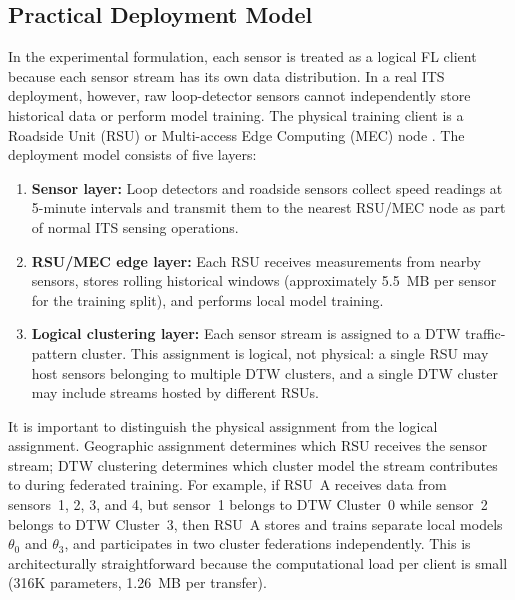 \subsection{Practical Deployment Model}
\label{sec:deployment}

In the experimental formulation, each sensor is treated as a logical FL client because each sensor stream has its own data distribution. In a real ITS deployment, however, raw loop-detector sensors cannot independently store historical data or perform model training. The physical training client is a Roadside Unit (RSU) or Multi-access Edge Computing (MEC) node \cite{nishio2019, bonawitz2019}. The deployment model consists of five layers:

\begin{enumerate}
    \item \textbf{Sensor layer:} Loop detectors and roadside sensors collect speed readings at 5-minute intervals and transmit them to the nearest RSU/MEC node as part of normal ITS sensing operations.
    \item \textbf{RSU/MEC edge layer:} Each RSU receives measurements from nearby sensors, stores rolling historical windows (approximately 5.5~MB per sensor for the training split), and performs local model training.
    \item \textbf{Logical clustering layer:} Each sensor stream is assigned to a DTW traffic-pattern cluster. This assignment is logical, not physical: a single RSU may host sensors belonging to multiple DTW clusters, and a single DTW cluster may include streams hosted by different RSUs.
\end{enumerate}

It is important to distinguish the physical assignment from the logical assignment. Geographic assignment determines which RSU receives the sensor stream; DTW clustering determines which cluster model the stream contributes to during federated training. For example, if RSU~A receives data from sensors~1, 2, 3, and 4, but sensor~1 belongs to DTW Cluster~0 while sensor~2 belongs to DTW Cluster~3, then RSU~A stores and trains separate local models $\theta_0$ and $\theta_3$, and participates in two cluster federations independently. This is architecturally straightforward because the computational load per client is small (316K parameters, 1.26~MB per transfer).

